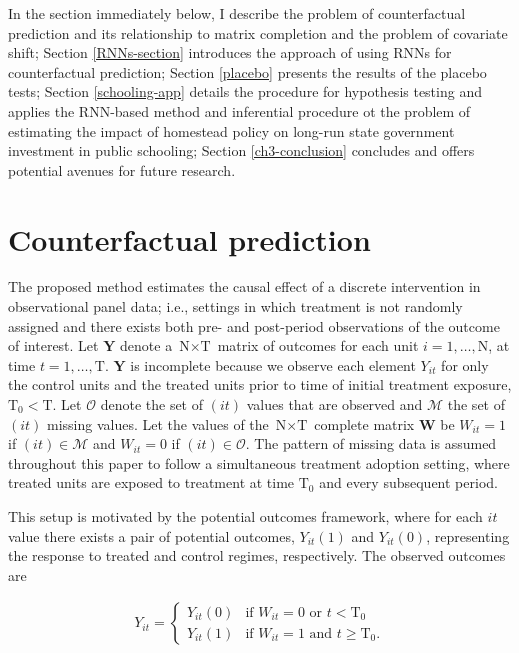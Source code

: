 In the section immediately below, I describe the problem of counterfactual prediction and its relationship to matrix completion and the problem of covariate shift; Section \ref{RNNs-section} introduces the approach of using RNNs for counterfactual prediction; Section \ref{placebo} presents the results of the placebo tests; Section \ref{schooling-app} details the procedure for hypothesis testing and applies the RNN-based method and inferential procedure ot the problem of estimating the impact of homestead policy on long-run state government investment in public schooling; Section \ref{ch3-conclusion} concludes and offers potential avenues for future research. 

\section{Counterfactual prediction} \label{prediction}

The proposed method estimates the causal effect of a discrete intervention in observational panel data; i.e., settings in which treatment is not randomly assigned and there exists both pre- and post-period observations of the outcome of interest. Let $\boldsymbol{Y}$ denote a $\text{N} \times \text{T}$ matrix of outcomes for each unit $i =1, \ldots, \text{N}$, at time $t = 1, \ldots, \text{T}$. $\boldsymbol{Y}$ is incomplete because we observe each element $Y_{it}$ for only the control units and the treated units prior to time of initial treatment exposure, $\text{T}_0 < \text{T}$. Let $\mathcal{O}$ denote the set of $(it)$ values that are observed and $\mathcal{M}$ the set of $(it)$ missing values. Let the values of the $\text{N} \times \text{T}$ complete matrix $\boldsymbol{W}$ be $W_{it} =1$ if $(it) \in \mathcal{M}$ and $W_{it} = 0$ if $(it) \in \mathcal{O}$. The pattern of missing data is assumed throughout this paper to follow a simultaneous treatment adoption setting, where treated units are exposed to treatment at time $\text{T}_0$ and every subsequent period. 

This setup is motivated by the \citet{neyman1923} potential outcomes framework, where for each $it$ value there exists a pair of potential outcomes, $Y_{it}(1)$ and $Y_{it}(0)$, representing the response to treated and control regimes, respectively. The observed outcomes are 

\begin{align*} 
	Y_{it} = \begin{cases}
		Y_{it}(0) 	& \mbox{if } W_{it} = 0  \text{ or } t < \text{T}_0 \\
		Y_{it}(1) 	& \mbox{if } W_{it} = 1  \text{ and } t \geq \text{T}_0.
	\end{cases} 
\end{align*} 

